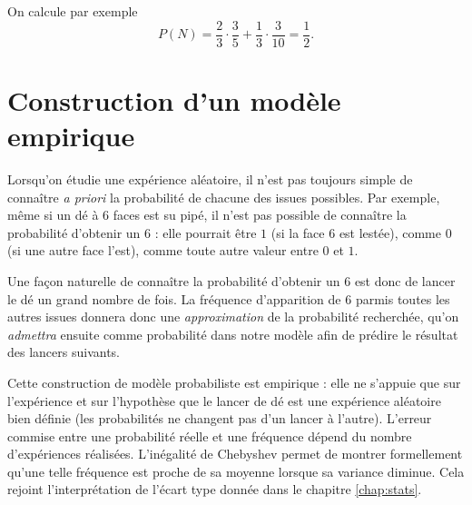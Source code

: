 {\begin{center}
	\end{center}
	On calcule par exemple
		\[ P(N) = \dfrac23 \cdot \dfrac35 + \dfrac13 \cdot \dfrac3{10} = \dfrac12. \]
}{}


\section{Construction d'un modèle empirique}

Lorsqu'on étudie une expérience aléatoire, il n'est pas toujours simple de connaître \emph{a priori} la probabilité de chacune des issues possibles.
Par exemple, même si un dé à $6$ faces est su pipé, il n'est pas possible de connaître la probabilité d'obtenir un $6$ : elle pourrait être $1$ (si la face $6$ est lestée), comme $0$ (si une autre face l'est), comme toute autre valeur entre $0$ et $1$.

Une façon naturelle de connaître la probabilité d'obtenir un $6$ est donc de lancer le dé un grand nombre de fois.
La fréquence d'apparition de $6$ parmis toutes les autres issues donnera donc une \emph{approximation} de la probabilité recherchée, qu'on \emph{admettra} ensuite comme probabilité dans notre modèle afin de prédire le résultat des lancers suivants.

Cette construction de modèle probabiliste est empirique : elle ne s'appuie que sur l'expérience et sur l'hypothèse que le lancer de dé est une expérience aléatoire bien définie (les probabilités ne changent pas d'un lancer à l'autre).
L'erreur commise entre une probabilité réelle et une fréquence dépend du nombre d'expériences réalisées.
L'inégalité de Chebyshev permet de montrer formellement qu'une telle fréquence est proche de sa moyenne lorsque sa variance diminue.
Cela rejoint l'interprétation de l'écart type donnée dans le chapitre \ref{chap:stats}.

